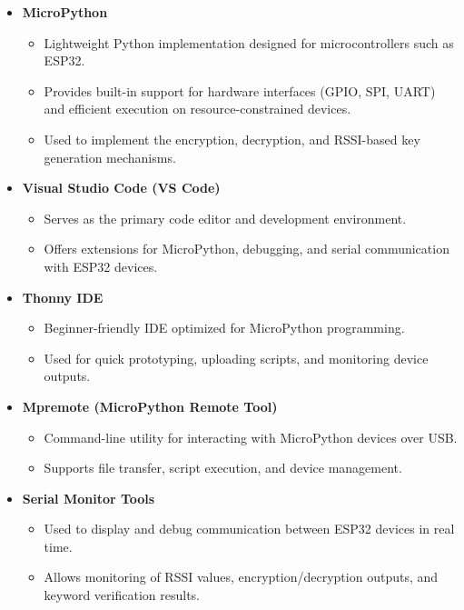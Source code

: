 \begin{itemize}
    \item \textbf{MicroPython} 
    \begin{itemize}
            \item Lightweight Python implementation designed for microcontrollers such as ESP32.
             \item Provides built-in support for hardware interfaces (GPIO, SPI, UART) and efficient execution on resource-constrained devices.
            \item Used to implement the encryption, decryption, and RSSI-based key generation mechanisms.

        \end{itemize} 
    \item \textbf{Visual Studio Code (VS Code)} 
        \begin{itemize} 
            \item Serves as the primary code editor and development environment.
            \item Offers extensions for MicroPython, debugging, and serial communication with ESP32 devices.
        \end{itemize} 

    \item \textbf{Thonny IDE} 
        \begin{itemize} 
            \item Beginner-friendly IDE optimized for MicroPython programming.
            \item  Used for quick prototyping, uploading scripts, and monitoring device outputs.
        \end{itemize} 
 

    \item \textbf{Mpremote (MicroPython Remote Tool)} 
      \begin{itemize} 
            \item Command-line utility for interacting with MicroPython devices over USB.
            \item Supports file transfer, script execution, and device management.
        \end{itemize} 
         \item \textbf{Serial Monitor Tools} 
      \begin{itemize} 
            \item Used to display and debug communication between ESP32 devices in real time.
            \item Allows monitoring of RSSI values, encryption/decryption outputs, and keyword verification results.
        \end{itemize}
\end{itemize}

